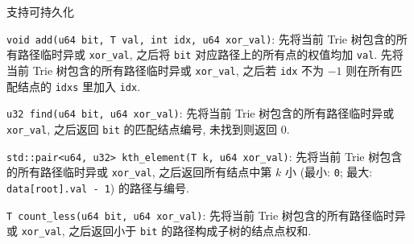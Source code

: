 支持可持久化

\verb|void add(u64 bit, T val, int idx, u64 xor_val)|: 先将当前 Trie 树包含的所有路径临时异或 \verb|xor_val|, 之后将 \verb|bit| 对应路径上的所有点的权值均加 \verb|val|. 先将当前 Trie 树包含的所有路径临时异或 \verb|xor_val|, 之后若 \verb|idx| 不为 \(-1\) 则在所有匹配结点的 \verb|idxs| 里加入 \verb|idx|.

\verb|u32 find(u64 bit, u64 xor_val)|: 先将当前 Trie 树包含的所有路径临时异或 \verb|xor_val|, 之后返回 \verb|bit| 的匹配结点编号, 未找到则返回 \(0\).

\verb|std::pair<u64, u32> kth_element(T k, u64 xor_val)|: 先将当前 Trie 树包含的所有路径临时异或 \verb|xor_val|, 之后返回所有结点中第 \(k\) 小 (最小: \verb|0|; 最大: \verb|data[root].val - 1|) 的路径与编号.

\verb|T count_less(u64 bit, u64 xor_val)|: 先将当前 Trie 树包含的所有路径临时异或 \verb|xor_val|, 之后返回小于 \verb|bit| 的路径构成子树的结点点权和.
